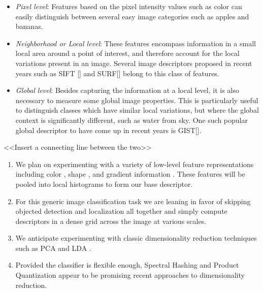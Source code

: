 \documentclass[12pt]{article}
\begin{document}
\begin{itemize}
\item \textit{Pixel level}: Features based on the pixel intensity values such as color can easily distinguish between several easy image categories such as apples and bananas.

\item \textit{Neighborhood or Local level}: These features encompass information in a small local area around a point of interest, and therefore account for the local variations present in an image. Several image descriptors proposed in recent years such as SIFT [] and SURF[] belong to this class of features.

\item \textit{Global level}: Besides capturing the information at a local level, it is also necessary to measure some global image properties. This is particularly useful to distinguish classes which have similar local variations, but where the global context is significantly different, such as water from sky. One such popular global descriptor to have come up in recent years is 
GIST[].
\end{itemize}

<<Insert a connecting line between the two>>

\begin{enumerate}

\item We plan on experimenting with a variety of low-level feature representations including color \cite{sande10}, shape \cite{ahonen06}, and gradient information \cite{lowe04,dalal05}. These features will be pooled into local histograms to form our base descriptor.

\item For this generic image classification task we are leaning in favor of skipping objected detection and localization all together and simply compute descriptors in a dense grid across the image at various scales.

\item We anticipate experimenting with classic dimensionality reduction techniques such as PCA \cite{turk91} and LDA \cite{belhumeur97}.

\item Provided the classifier is flexible enough, Spectral Hashing \cite{weiss2008} and Product Quantization \cite{jegou2011} appear to be promising recent approaches to dimensionality reduction.

\end{enumerate}



\end{document}
